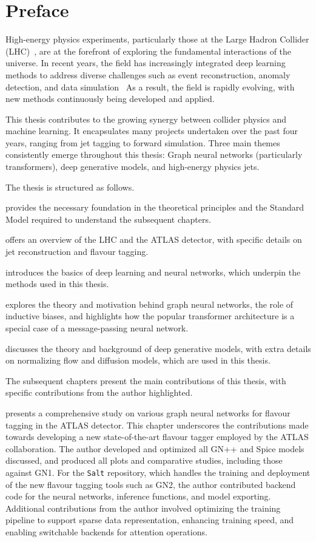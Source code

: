 \chapter{Preface}
\label{ch:intro}

High-energy physics experiments, particularly those at the Large Hadron Collider (LHC)~\cite{LHCMachine}, are at the forefront of exploring the fundamental interactions of the universe.
In recent years, the field has increasingly integrated deep learning methods to address diverse challenges such as event reconstruction, anomaly detection, and data simulation~\cite{Albertsson:2018maf}
As a result, the field is rapidly evolving, with new methods continuously being developed and applied.

This thesis contributes to the growing synergy between collider physics and machine learning.
It encapsulates many projects undertaken over the past four years, ranging from jet tagging to forward simulation.
Three main themes consistently emerge throughout this thesis: Graph neural networks (particularly transformers), deep generative models, and high-energy physics jets.

The thesis is structured as follows.

 provides the necessary foundation in the theoretical principles and the Standard Model required to understand the subsequent chapters.

 offers an overview of the LHC and the ATLAS detector, with specific details on jet reconstruction and flavour tagging.

 introduces the basics of deep learning and neural networks, which underpin the methods used in this thesis.

 explores the theory and motivation behind graph neural networks, the role of inductive biases, and highlights how the popular transformer architecture is a special case of a message-passing neural network.

 discusses the theory and background of deep generative models, with extra details on normalizing flow and diffusion models, which are used in this thesis.

The subsequent chapters present the main contributions of this thesis, with specific contributions from the author highlighted.

 presents a comprehensive study on various graph neural networks for flavour tagging in the ATLAS detector.
This chapter underscores the contributions made towards developing a new state-of-the-art flavour tagger employed by the ATLAS collaboration.
The author developed and optimized all GN++ and Spice models discussed, and produced all plots and comparative studies, including those against GN1.
For the \texttt{Salt} repository, which handles the training and deployment of the new flavour tagging tools such as GN2, the author contributed backend code for the neural networks, inference functions, and model exporting.
Additional contributions from the author involved optimizing the training pipeline to support sparse data representation, enhancing training speed, and enabling switchable backends for attention operations.

